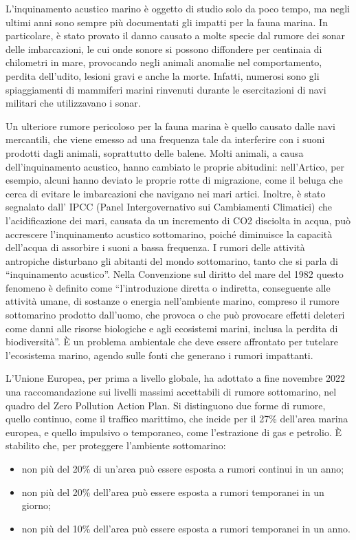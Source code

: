 L’inquinamento acustico marino è oggetto di studio solo da poco tempo, ma negli ultimi anni sono sempre più documentati gli impatti per la fauna marina. 
In particolare, è stato provato il danno causato a molte specie dal rumore dei sonar delle imbarcazioni, le cui onde sonore si possono diffondere per centinaia di chilometri in mare, provocando negli animali anomalie nel comportamento, perdita dell’udito, lesioni gravi e anche la morte. 
Infatti, numerosi sono gli spiaggiamenti di mammiferi marini rinvenuti durante le esercitazioni di navi militari che utilizzavano i sonar.

Un ulteriore rumore pericoloso per la fauna marina è quello causato dalle navi mercantili, che viene emesso ad una frequenza tale da interferire con i suoni prodotti dagli animali, soprattutto delle balene. 
Molti animali, a causa dell’inquinamento acustico, hanno cambiato le proprie abitudini: nell’Artico, per esempio, alcuni hanno deviato le proprie rotte di migrazione, come il beluga che cerca di evitare le imbarcazioni che navigano nei mari artici. 
Inoltre, è stato segnalato dall’ IPCC (Panel Intergovernativo sui Cambiamenti Climatici) che l’acidificazione dei mari, causata da un incremento di CO2 disciolta in acqua, può accrescere l’inquinamento acustico sottomarino, poiché diminuisce la capacità dell’acqua di assorbire i suoni a bassa frequenza.
I rumori delle attività antropiche disturbano gli abitanti del mondo sottomarino, tanto che si parla di “inquinamento acustico”. 
Nella Convenzione sul diritto del mare del 1982 questo fenomeno è definito come “l’introduzione diretta o indiretta, conseguente alle attività umane, di sostanze o energia nell’ambiente marino, compreso il rumore sottomarino prodotto dall’uomo, che provoca o che può provocare effetti deleteri come danni alle risorse biologiche e agli ecosistemi marini, inclusa la perdita di biodiversità”. 
È un problema ambientale che deve essere affrontato per tutelare l’ecosistema marino, agendo sulle fonti che generano i rumori impattanti.

L’Unione Europea, per prima a livello globale, ha adottato a fine novembre 2022 una raccomandazione sui livelli massimi accettabili di rumore sottomarino, nel quadro del Zero Pollution Action Plan. 
Si distinguono due forme di rumore, quello continuo, come il traffico marittimo, che incide per il 27\% dell’area marina europea, e quello impulsivo o temporaneo, come l’estrazione di gas e petrolio. 
È stabilito che, per proteggere l’ambiente sottomarino:
\begin{itemize}
\item non più del 20\% di un’area può essere esposta a rumori continui in un anno;
\item non più del 20\% dell’area può essere esposta a rumori temporanei in un giorno;
\item non più del 10\% dell’area può essere esposta a rumori temporanei in un anno.
\end{itemize}

